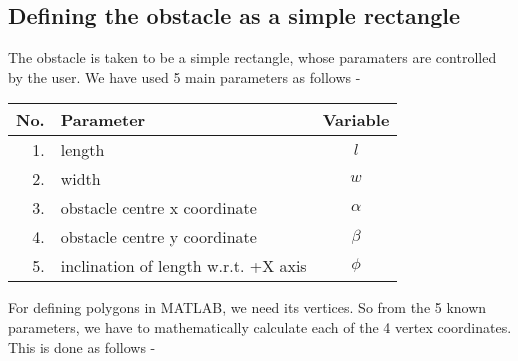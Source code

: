\documentclass[12pt]{article}
\begin{document}
\subsection{Defining the obstacle as a simple rectangle}
The obstacle is taken to be a simple rectangle, whose paramaters are controlled by the user. We have used 5 main parameters as follows -
\begin{flushleft}
\begin{tabular}{|r|l|c|}
\hline
\textbf{No.} & \textbf{Parameter} & \textbf{Variable} \\
\hline
1. & length & $l$ \\
\hline
2. & width & $w$ \\
\hline
3. & obstacle centre x coordinate & $\alpha$ \\
\hline
4. & obstacle centre y coordinate & $\beta$ \\
\hline
5. & inclination of length w.r.t. +X axis & $\phi$ \\
\hline
\end{tabular}
\end{flushleft}
For defining polygons in MATLAB, we need its vertices. So from the 5 known parameters, we have to mathematically calculate each of the 4 vertex coordinates. This is done as follows - 
\end{document}
